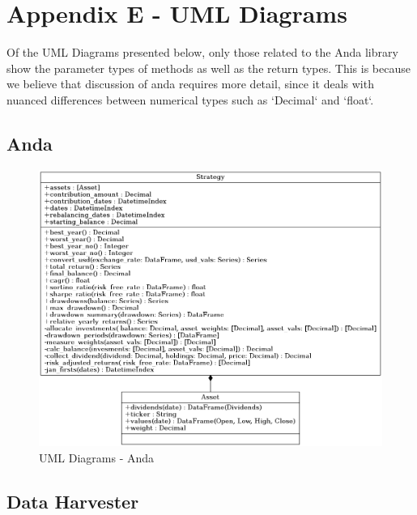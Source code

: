 \documentclass[main.tex]{subfiles}
\begin{document}
\section{Appendix E - UML Diagrams}
\label{umls}

Of the UML Diagrams presented below, only those related to the Anda library show the parameter types of methods as well as the return types. This is because we believe that discussion of anda requires more detail, since it deals with nuanced differences between numerical types such as `Decimal` and `float`.

\subsection{Anda}

\begin{figure}[H]
   \centering
   \includegraphics[width=\textwidth,keepaspectratio]{Report/08Appendices/084UML/084Pictures/classes_analyse_data.png}
   \caption{UML Diagrams - Anda}
\end{figure}

\subsection{Data Harvester}
\end{document}

